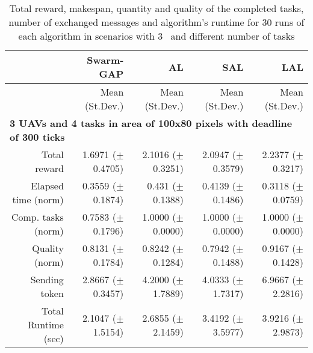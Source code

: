 \begin{table}%
	\small
	\fontsize{6}{6}\selectfont
	\centering
	\caption{Total reward, makespan, quantity and quality of the completed tasks, number of exchanged messages and algorithm's runtime for 30 runs of each algorithm in scenarios with 3 \uavs\ and different number of tasks}
	\label{table:allresults3uavs}
	
	\begin{tabular}{rrrrr} \hline
		& Swarm-GAP
		& AL
		& SAL
		& LAL \\ \hline 
		
		& Mean (St.Dev.) & Mean (St.Dev.)  & Mean (St.Dev.)  & Mean (St.Dev.)  \\ [1ex]
		
		\multicolumn{5}{l}{\textbf{3 UAVs and 4 tasks in area of 100x80 pixels with deadline of 300 ticks}} \\
		Total reward           &   1.6971  ($\pm$0.4705) &  2.1016   ($\pm$0.3251)   &  2.0947   ($\pm$0.3579) &   2.2377   ($\pm$0.3217) \\
		Elapsed time (norm)    &   0.3559  ($\pm$0.1874) &  0.431    ($\pm$0.1388)   &  0.4139   ($\pm$0.1486) &   0.3118   ($\pm$0.0759) \\ 
		Comp. tasks (norm)     &   0.7583  ($\pm$0.1796) &  1.0000   ($\pm$0.0000)   &  1.0000   ($\pm$0.0000) &   1.0000   ($\pm$0.0000) \\ 
		Quality (norm)         &   0.8131  ($\pm$0.1784) &  0.8242   ($\pm$0.1284)   &  0.7942   ($\pm$0.1488) &   0.9167   ($\pm$0.1428) \\ 
		Sending token          &   2.8667  ($\pm$0.3457) &  4.2000   ($\pm$1.7889)   &  4.0333   ($\pm$1.7317) &   6.9667   ($\pm$2.2816) \\ 
		Total Runtime (sec)    &   2.1047  ($\pm$1.5154) &  2.6855   ($\pm$2.1459)   &  3.4192   ($\pm$3.5977) &   3.9216   ($\pm$2.9873) \\ [1ex]
		

\end{tabular}
\end{table}
